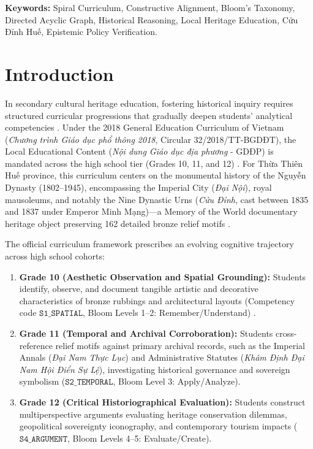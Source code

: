 \documentclass[11pt,a4paper]{article}
\begin{document}
\noindent\textbf{Keywords:} Spiral Curriculum, Constructive Alignment, Bloom's Taxonomy, Directed Acyclic Graph, Historical Reasoning, Local Heritage Education, Cửu Đỉnh Huế, Epistemic Policy Verification.

\section{Introduction}

In secondary cultural heritage education, fostering historical inquiry requires structured curricular progressions that gradually deepen students' analytical competencies \cite{bruner1960process, biggs2011teaching, vandrie2008historical}. Under the 2018 General Education Curriculum of Vietnam (\textit{Chương trình Giáo dục phổ thông 2018}, Circular 32/2018/TT-BGDĐT), the Local Educational Content (\textit{Nội dung Giáo dục địa phương} - GDĐP) is mandated across the high school tier (Grades 10, 11, and 12) \cite{moet2018general}. For Thừa Thiên Huế province, this curriculum centers on the monumental history of the Nguyễn Dynasty (1802--1945), encompassing the Imperial City (\textit{Đại Nội}), royal mausoleums, and notably the Nine Dynastic Urns (\textit{Cửu Đỉnh}, cast between 1835 and 1837 under Emperor Minh Mạng)---a Memory of the World documentary heritage object preserving 162 detailed bronze relief motifs \cite{nguyen2012cuudinh, phan1995hue}.

The official curriculum framework prescribes an evolving cognitive trajectory across high school cohorts:
\begin{enumerate}[label=(\alph*)]
    \item \textbf{Grade 10 (Aesthetic Observation and Spatial Grounding):} Students identify, observe, and document tangible artistic and decorative characteristics of bronze rubbings and architectural layouts (Competency code $\mathtt{S1\_SPATIAL}$, Bloom Levels 1--2: Remember/Understand) \cite{krathwohl2002revision}.
    \item \textbf{Grade 11 (Temporal and Archival Corroboration):} Students cross-reference relief motifs against primary archival records, such as the Imperial Annals (\textit{Đại Nam Thực Lục}) and Administrative Statutes (\textit{Khâm Định Đại Nam Hội Điển Sự Lệ}), investigating historical governance and sovereign symbolism ($\mathtt{S2\_TEMPORAL}$, Bloom Level 3: Apply/Analyze).
    \item \textbf{Grade 12 (Critical Historiographical Evaluation):} Students construct multiperspective arguments evaluating heritage conservation dilemmas, geopolitical sovereignty iconography, and contemporary tourism impacts ($\mathtt{S4\_ARGUMENT}$, Bloom Levels 4--5: Evaluate/Create).
\end{enumerate}
\end{document}

